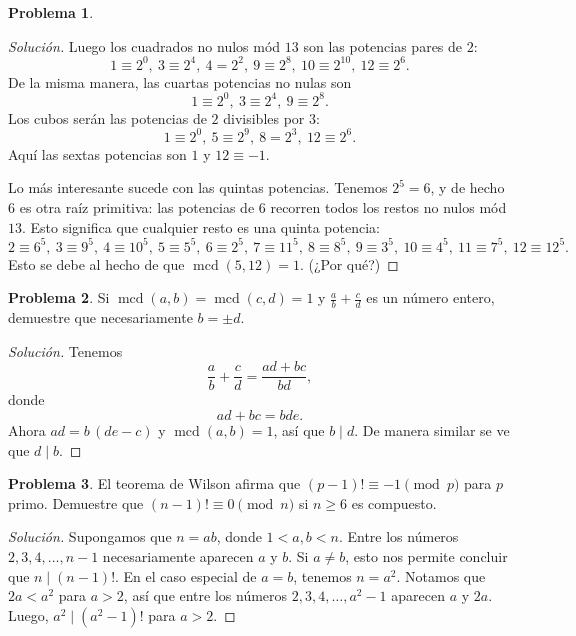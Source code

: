 \documentclass{article}
\DeclareMathOperator{\mcd}{mcd}
\theoremstyle{definition}
\newtheorem{problema}{Problema}
\newenvironment{solucion}{\begin{proof}[Solución]\small}{\end{proof}}
\begin{document}
\begin{problema}
\begin{solucion}
    Luego los cuadrados no nulos mód $13$ son las potencias pares de $2$:
    \[ 1 \equiv 2^0, ~
      3 \equiv 2^4, ~
      4 = 2^2, ~
      9 \equiv 2^8, ~
      10 \equiv 2^{10}, ~
      12 \equiv 2^6. \]
    De la misma manera, las cuartas potencias no nulas son
    \[ 1 \equiv 2^0, ~
      3 \equiv 2^4, ~
      9 \equiv 2^8. \]
    Los cubos serán las potencias de $2$ divisibles por $3$:
    \[ 1 \equiv 2^0, ~
      5 \equiv 2^9, ~
      8 = 2^3, ~
      12 \equiv 2^6. \]    
    Aquí las sextas potencias son $1$ y $12 \equiv -1$.

    Lo más interesante sucede con las quintas potencias. Tenemos $2^5 = 6$, y de
    hecho $6$ es otra raíz primitiva: las potencias de $6$ recorren todos los
    restos no nulos mód $13$. Esto significa que cualquier resto es una quinta potencia:
    \[
      2 \equiv 6^5, ~
      3 \equiv 9^5, ~
      4 \equiv 10^5, ~
      5 \equiv 5^5, ~
      6 \equiv 2^5, ~
      7 \equiv 11^5, ~
      8 \equiv 8^5, ~
      9 \equiv 3^5, ~
      10 \equiv 4^5, ~
      11 \equiv 7^5, ~
      12 \equiv 12^5.
    \]
    Esto se debe al hecho de que $\mcd (5,12) = 1$. (¿Por qué?)
  \end{solucion}\fi
\end{problema}

\begin{problema}
  Si $\mcd (a,b) = \mcd (c,d) = 1$ y $\frac{a}{b} + \frac{c}{d}$ es un número
  entero, demuestre que necesariamente $b = \pm d$.

  \ifdefined\solutions\begin{solucion}
    Tenemos
    $$\frac{a}{b} + \frac{c}{d} = \frac{ad + bc}{bd},$$
    donde
    $$ad + bc = bde.$$
    Ahora $ad = b\,(de - c)$ y $\mcd (a,b) = 1$, así que $b \mid d$. De manera
    similar se ve que $d \mid b$.
  \end{solucion}\fi
\end{problema}

\begin{problema}
  El teorema de Wilson afirma que $(p - 1)! \equiv -1 \pmod{p}$ para $p$
  primo. Demuestre que $(n-1)! \equiv 0 \pmod{n}$ si $n \ge 6$ es compuesto.

  \ifdefined\solutions\begin{solucion}    
    Supongamos que $n = ab$, donde $1 < a,b < n$. Entre los números
    $2,3,4,\ldots,n-1$ necesariamente aparecen $a$ y $b$. Si $a \ne b$, esto nos
    permite concluir que $n \mid (n-1)!$. En el caso especial de $a = b$,
    tenemos $n = a^2$. Notamos que $2a < a^2$ para $a > 2$, así que entre los
    números $2,3,4,\ldots,a^2-1$ aparecen $a$ y $2a$. Luego, $a^2 \mid (a^2-1)!$
    para $a > 2$.
  \end{solucion}\fi
\end{problema}
\end{document}
